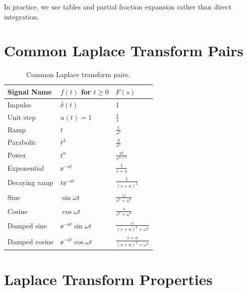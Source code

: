 In practice, we use tables and partial fraction expansion rather than direct integration.

\section{Common Laplace Transform Pairs}

\begin{table}[htbp]
\centering
\begin{tabular}{lll}
\toprule
\textbf{Signal Name} & $f(t)$ for $t \geq 0$ & $F(s)$ \\
\midrule
Impulse & $\delta(t)$ & $1$ \\
Unit step & $u(t) = 1$ & $\frac{1}{s}$ \\
Ramp & $t$ & $\frac{1}{s^2}$ \\
Parabolic & $t^2$ & $\frac{2}{s^3}$ \\
Power & $t^n$ & $\frac{n!}{s^{n+1}}$ \\
Exponential & $\ee^{-at}$ & $\frac{1}{s+a}$ \\
Decaying ramp & $t\ee^{-at}$ & $\frac{1}{(s+a)^2}$ \\
Sine & $\sin\omega t$ & $\frac{\omega}{s^2+\omega^2}$ \\
Cosine & $\cos\omega t$ & $\frac{s}{s^2+\omega^2}$ \\
Damped sine & $\ee^{-at}\sin\omega t$ & $\frac{\omega}{(s+a)^2+\omega^2}$ \\
Damped cosine & $\ee^{-at}\cos\omega t$ & $\frac{s+a}{(s+a)^2+\omega^2}$ \\
\bottomrule
\end{tabular}
\caption{Common Laplace transform pairs.}
\label{tab:laplace_pairs}
\end{table}

\section{Laplace Transform Properties}

